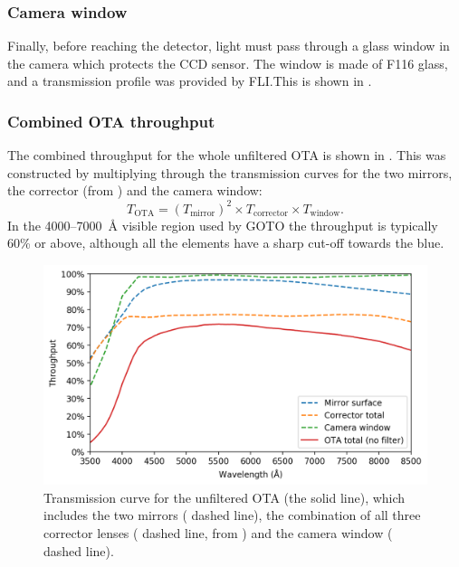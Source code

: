\begin{colsection}
\begin{colsection}
\subsubsection{Camera window}

Finally, before reaching the detector, light must pass through a glass window in the camera which protects the CCD sensor. The window is made of F116 glass, and a transmission profile was provided by FLI.\@ This is shown in .

\newpage

\subsubsection{Combined OTA throughput}

The combined throughput for the whole unfiltered OTA is shown in . This was constructed by multiplying through the transmission curves for the two mirrors, the corrector (from ) and the camera window:
%
\begin{equation}
    T_\text{OTA} = {(T_\text{mirror})}^2 \times T_\text{corrector} \times T_\text{window}.
    \label{eq:ota}
\end{equation}
%
In the 4000--\SI{7000}{\angstrom} visible region used by GOTO the throughput is typically 60\% or above, although all the elements have a sharp cut-off towards the blue.

\begin{figure}[t]
    \begin{center}
        \includegraphics[width=\textwidth]{images/throughput/trans_ota.png}
    \end{center}
    \caption[Combined OTA transmission curve]{
        Transmission curve for the unfiltered OTA (the  solid line), which includes the two mirrors ( dashed line), the combination of all three corrector lenses ( dashed line, from ) and the camera window ( dashed line).
    }\label{fig:trans_ota}
\end{figure}


\end{colsection}
\end{colsection}
